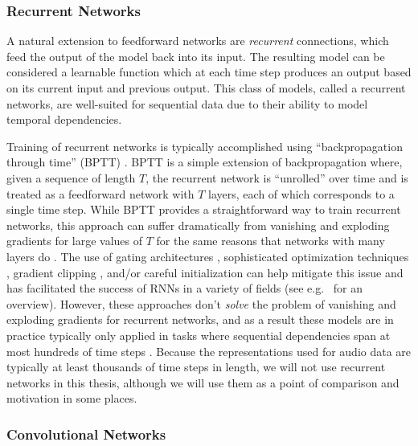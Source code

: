 \subsubsection{Recurrent Networks}

A natural extension to feedforward networks are {\em recurrent} connections, which feed the output of the model back into its input.
The resulting model can be considered a learnable function which at each time step produces an output based on its current input and previous output.
This class of models, called a recurrent networks, are well-suited for sequential data due to their ability to model temporal dependencies.

Training of recurrent networks is typically accomplished using ``backpropagation through time'' (BPTT) \cite{}.
BPTT is a simple extension of backpropagation where, given a sequence of length $T$, the recurrent network is ``unrolled'' over time and is treated as a feedforward network with $T$ layers, each of which corresponds to a single time step.
While BPTT provides a straightforward way to train recurrent networks, this approach can suffer dramatically from vanishing and exploding gradients for large values of $T$ for the same reasons that networks with many layers do \cite{}.
The use of gating architectures \cite{hochreiter1997long,cho2014learning}, sophisticated optimization techniques \cite{martens2011learning,sutskever2013importance}, gradient clipping \cite{pascanu2012difficulty,graves2013generating}, and/or careful initialization \cite{sutskever2013importance,jaegar2012long,mikolov2014learning,le2015simple} can help mitigate this issue and has facilitated the success of RNNs in a variety of fields (see e.g.\ \cite{graves2012supervised} for an overview).
However, these approaches don't {\em solve} the problem of vanishing and exploding gradients for recurrent networks, and as a result these models are in practice typically only applied in tasks where sequential dependencies span at most hundreds of time steps \cite{martens2011learning,sutskever2013importance,le2015simple,hochreiter1997long,krueger2015regularizing,arjovsky2015unitary}.
Because the representations used for audio data are typically at least thousands of time steps in length, we will not use recurrent networks in this thesis, although we will use them as a point of comparison and motivation in some places.

\subsubsection{Convolutional Networks}

